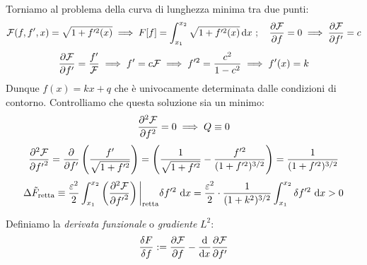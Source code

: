 \begin{example}
    Torniamo al problema della curva di lunghezza minima tra due punti: 
    \begin{equation*}
        \mathcal{F}(f,f',x)= \sqrt{1+f'^2(x)} \implies F[f]=\int_{x_1}^{x_2}\sqrt{1+f'^2(x)} \dd{x}\,;\quad
        \pdv{\mathcal{F}}{f }=0\implies \pdv{\mathcal{F}}{{f'}}= c
    \end{equation*}
    \begin{equation*}
        \pdv{\mathcal{F}}{{f'}}= \frac{f'}{\mathcal{F}}\implies f'=c\mathcal{F}\implies f'^2= \frac{c^2}{1-c^2}\implies
        f'(x)=k
    \end{equation*}
    Dunque $f(x)=kx+q$ che è univocamente determinata dalle condizioni di contorno. Controlliamo che questa soluzione sia un minimo:
    \begin{equation*}
        \pdv[2]{\mathcal{F}}{f} = 0 \implies Q \equiv 0
    \end{equation*}
    \begin{equation*}
        \pdv[2]{\mathcal{F}}{{f'}} = \pdv{}{f'}\left( \frac{f'}{\sqrt{1 + f'^2}} \right) =
        \left( \frac{1}{\sqrt{1 + f'^2}} - \frac{f'^2}{(1 + f'^2)^{3/2}} \right) = \frac{1}{(1 + f'^2)^{3/2}}
    \end{equation*}
    \begin{equation*}
        \Delta \tilde{F}_{\text{retta}} \equiv \frac{\varepsilon^2}{2} \int_{x_1}^{x_2}
        \left( \pdv[2]{\mathcal{F}}{{f'}} \right)\bigg|_{\text{retta}} \delta f'^2 \, \dd{x}
        = \frac{\varepsilon^2}{2} \cdot \frac{1}{(1 + k^2)^{3/2}} \int_{x_1}^{x_2} \delta f'^2 \, \dd{x} > 0
    \end{equation*}
\end{example}

\begin{definition}
    Definiamo la \textit{derivata funzionale} o\textit{ gradiente } $L^2$:
    \begin{equation}
        \frac{\delta F}{\delta f}:=\pdv{\mathcal{F}}{f}-\dv{x}\pdv{\mathcal{F}}{f'}
    \end{equation}
\end{definition}


